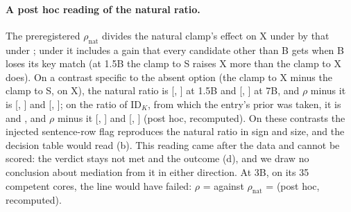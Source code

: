 \paragraph{A post hoc reading of the natural ratio.} The preregistered $\rho_{\mathrm{nat}}$ divides the natural clamp's effect on X under \fmtPost{} by that under \fmtOpt{}; under \fmtPost{} it includes a gain that every candidate other than B gets when B loses its key match (at 1.5B the clamp to S raises X more than the clamp to X does). On a contrast specific to the absent option (the clamp to X minus the clamp to S, on X), the natural ratio is \JdSixNatXQwenOnefive{} [\JdSixNatXQwenOnefiveLo{}, \JdSixNatXQwenOnefiveHi{}] at 1.5B and \JdSixNatXQwenSeven{} [\JdSixNatXQwenSevenLo{}, \JdSixNatXQwenSevenHi{}] at 7B, and $\rho$ minus it is \JdSixDiffXQwenOnefive{} [\JdSixDiffXQwenOnefiveLo{}, \JdSixDiffXQwenOnefiveHi{}] and \JdSixDiffXQwenSeven{} [\JdSixDiffXQwenSevenLo{}, \JdSixDiffXQwenSevenHi{}]; on the ratio of $\mathrm{ID}_K$, from which the entry's prior was taken, it is \JdSixNatIDKQwenOnefive{} and \JdSixNatIDKQwenSeven{}, and $\rho$ minus it \JdSixDiffIDKQwenOnefive{} [\JdSixDiffIDKQwenOnefiveLo{}, \JdSixDiffIDKQwenOnefiveHi{}] and \JdSixDiffIDKQwenSeven{} [\JdSixDiffIDKQwenSevenLo{}, \JdSixDiffIDKQwenSevenHi{}] (post hoc, recomputed). On these contrasts the injected sentence-row flag reproduces the natural ratio in sign and size, and the decision table would read (b). This reading came after the data and cannot be scored: the verdict stays not met and the outcome (d), and we draw no conclusion about mediation from it in either direction. At 3B, on its 35 competent cores, the line would have failed: $\rho$ = \JdSixRhoQwenThree{} against $\rho_{\mathrm{nat}}$ = \JdSixRhoNatQwenThree{} (post hoc, recomputed). %
